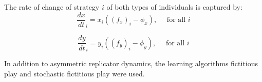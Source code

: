 The rate of change of strategy \( i \) of both types of individuals is captured 
by:
\begin{equation}
    \frac{dx}{dt}_i = x_i((f_x)_i - \phi_x), \quad \text{ for all }i
\end{equation}

\begin{equation}
    \frac{dy}{dt}_i = y_i((f_y)_i - \phi_y), \quad \text{ for all }i
\end{equation}
 
In addition to asymmetric replicator dynamics, the learning algorithms
fictitious play and stochastic fictitious play \cite{fudenberg1998theory}
were used.